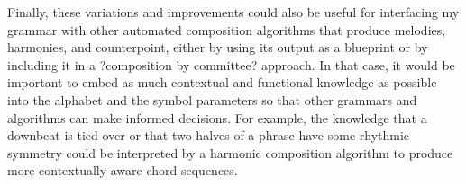 \documentclass{article}
\begin{document}
Finally, these variations and improvements could also be useful for interfacing my grammar with other automated composition algorithms that produce melodies, harmonies, and counterpoint, either by using its output as a blueprint or by including it in a ?composition by committee? approach. In that case, it would be important to embed as much contextual and functional knowledge as possible into the alphabet and the symbol parameters so that other grammars and algorithms can make informed decisions. For example, the knowledge that a downbeat is tied over or that two halves of a phrase have some rhythmic symmetry could be interpreted by a harmonic composition algorithm to produce more contextually aware chord sequences.


\end{document}
